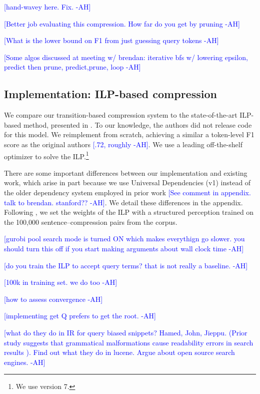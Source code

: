 \documentclass[11pt,a4paper]{article}
\newcommand{\ahcomment}[1]{\textcolor{blue}{[#1 -AH]}}
\begin{document}
\ahcomment{hand-wavey here. Fix.}

\ahcomment{Better job evaluating this compression. How far do you get  by pruning}

\ahcomment{What is the lower bound on F1 from just guessing query tokens} 

\ahcomment{Some algos discussed at meeting w/ brendan: iterative bfs w/ lowering epsilon, predict then prune, predict,prune, loop}

\subsection{Implementation: ILP-based compression}\label{s:ilp}

We compare our transition-based compression system to the state-of-the-art ILP-based method, presented in \citet{filippova2013overcoming}. To our knowledge, the authors did not release code for this model. We reimplement from scratch, achieving a similar a token-level F1 score as the original authors \ahcomment{.72, roughly}. We use a leading off-the-shelf optimizer \cite{gurobi} to solve the ILP.\footnote{We use version 7.} 

There are some important differences between our implementation and existing work, which arise in part because we use Universal Dependencies (v1) instead of the older dependency system employed in prior work \ahcomment{See comment in appendix. talk to brendan. stanford??}. We detail these differences in the appendix. Following \citet{filippova2013overcoming}, we set the weights of the ILP with a structured perception trained on the 100,000 sentence--compression pairs from the corpus.

\ahcomment{gurobi pool search mode is turned ON which makes everythign go slower. you should turn this off if you start making arguments about wall clock time}

\ahcomment{do you train the ILP to accept query terms? that is not really a baseline. }

\ahcomment{100k in training set. we do too }

\ahcomment{how to assess convergence}

\ahcomment{implementing get Q prefers to get the root. }


\ahcomment{what do they do in IR for query biased snippets? Hamed, John, Jieppu.
 (Prior study suggests that grammatical malformations cause readability errors in search results \cite{kanungo2009predicting}).
 Find out what they do in lucene. Argue about open source search engines. }
\end{document}

